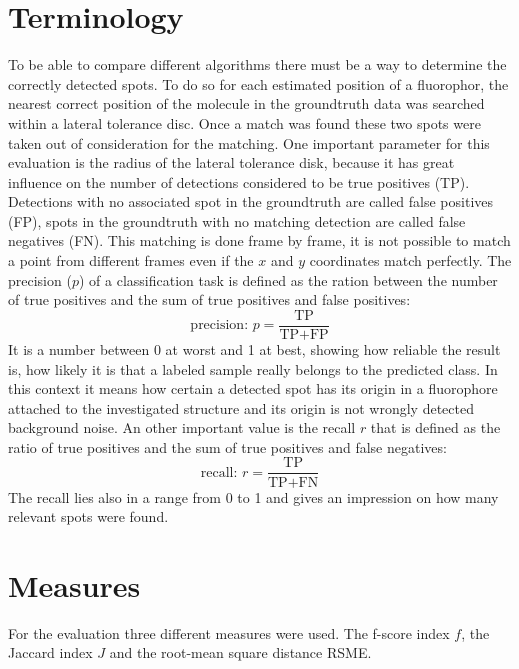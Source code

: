 \section{Terminology}
To be able to compare different algorithms there must be a way to determine the correctly detected spots. To do so for each estimated position of a fluorophor, the nearest correct position of the molecule in the groundtruth data was searched within a lateral tolerance disc. Once a match was found these two spots were taken out of consideration for the matching.\newline
One important parameter for this evaluation is the radius of the lateral tolerance disk, because it has great influence on the number of detections considered to be true positives (TP).\newline
Detections with no associated spot in the groundtruth are called false positives (FP), spots in the groundtruth with no matching detection are called false negatives (FN).\newline
This matching is done frame by frame, it is not possible to match a point from different frames even if the $x$ and $y$ coordinates match perfectly.\newline
The precision ($p$) of a classification task is defined as the ration between the number of true positives and the sum of true positives and false positives:
\begin{equation}
\text{precision: }p = \frac{\text{TP}}{\text{TP}+\text{FP}} 
\end{equation}
It is a number between 0 at worst and 1 at best, showing how reliable the result is, how likely it is that a labeled sample really belongs to the predicted class. In this context it means how certain a detected spot has its origin in a fluorophore attached to the investigated structure and its origin is not wrongly detected background noise.\newline
An other important value is the recall $r$ that is defined as the ratio of true positives and the sum of true positives and false negatives:
\begin{equation}
\text{recall: }r = \frac{\text{TP}}{\text{TP}+\text{FN}}
\end{equation}
The recall lies also in a range from 0 to 1  and gives an impression on how many relevant spots were found.

\section{Measures} \label{measuresISBI}
For the evaluation three different measures were used. The f-score index $f$, the Jaccard index $J$ and the root-mean square distance RSME. 
